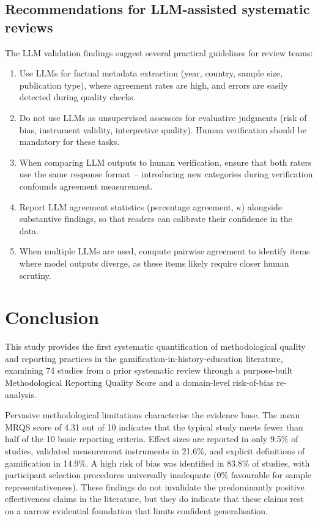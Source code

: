 \documentclass[etq]{acnsart}
\begin{document}
	\subsection{Recommendations for LLM-assisted systematic reviews}
	\label{sec:discussion_llm_recs}
	
	The LLM validation findings suggest several practical guidelines for review teams:
	
	\begin{enumerate}%
		\item Use LLMs for factual metadata extraction (year, country, sample size, publication type), where agreement rates are high, and errors are easily detected during quality checks.
		\item Do not use LLMs as unsupervised assessors for evaluative judgments (risk of bias, instrument validity, interpretive quality). Human verification should be mandatory for these tasks.
		\item When comparing LLM outputs to human verification, ensure that both raters use the same response format~-- introducing new categories during verification confounds agreement measurement.
		\item Report LLM agreement statistics (percentage agreement, $\kappa$) alongside substantive findings, so that readers can calibrate their confidence in the data.
		\item When multiple LLMs are used, compute pairwise agreement to identify items where model outputs diverge, as these items likely require closer human scrutiny.
	\end{enumerate}
	
	
	
	\section{Conclusion}
	\label{sec:conclusion}
	
	This study provides the first systematic quantification of methodological quality and reporting practices in the gamification-in-history-education literature, examining 74 studies from a prior systematic review through a purpose-built Methodological Reporting Quality Score and a domain-level risk-of-bias re-analysis.
	
	Pervasive methodological limitations characterise the evidence base. The mean MRQS score of 4.31 out of 10 indicates that the typical study meets fewer than half of the 10 basic reporting criteria. Effect sizes are reported in only 9.5\% of studies, validated measurement instruments in 21.6\%, and explicit definitions of gamification in 14.9\%. A high risk of bias was identified in 83.8\% of studies, with participant selection procedures universally inadequate (0\% favourable for sample representativeness). These findings do not invalidate the predominantly positive effectiveness claims in the literature, but they do indicate that these claims rest on a narrow evidential foundation that limits confident generalisation.
	
\end{document}
